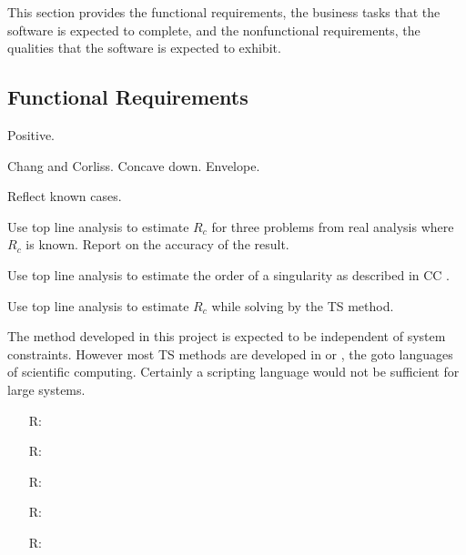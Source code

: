 \documentclass[12pt]{article}
\newcounter{reqnum} %
\begin{document}
This section provides the functional requirements, the business tasks that the
software is expected to complete, and the nonfunctional requirements, the
qualities that the software is expected to exhibit.

\subsection{Functional Requirements}

Positive.

Chang and Corliss. Concave down. Envelope.

Reflect known cases.

Use top line analysis to estimate $R_c$ for three problems from real analysis where $R_c$ is known.
Report on the accuracy of the result.

Use top line analysis to estimate the order of a singularity as described in CC \cite[pp.~127--128]{chang1982}.

Use top line analysis to estimate $R_c$ while solving \ode \ivp by the TS method.

The method developed in this project is expected to be independent of system constraints. However
most TS methods are developed in \cpp or \fortran, the goto languages of scientific computing.
Certainly a scripting language would not be sufficient for large systems.

\noindent \begin{itemize}

\item[R\refstepcounter{reqnum}\thereqnum \label{R_Inputs}:] 

\item[R\refstepcounter{reqnum}\thereqnum \label{R_OutputInputs}:] 

\item[R\refstepcounter{reqnum}\thereqnum \label{R_Calculate}:] 

\item[R\refstepcounter{reqnum}\thereqnum \label{R_VerifyOutput}:]

\item[R\refstepcounter{reqnum}\thereqnum \label{R_Output}:] 

\end{itemize}
\end{document}

